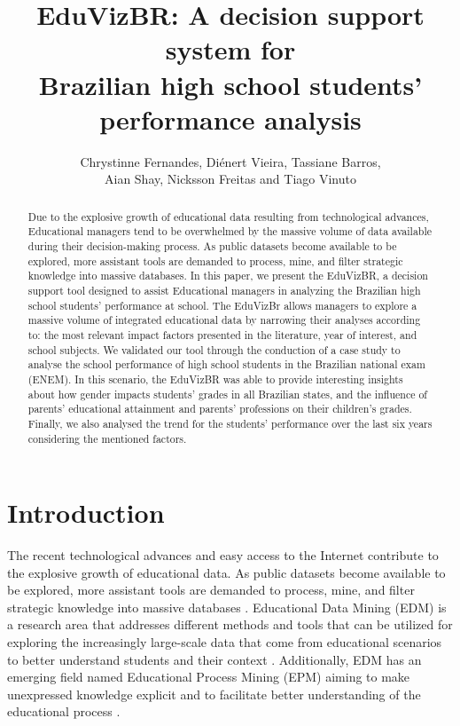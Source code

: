 \documentclass[12pt]{article}
\title{EduVizBR: A decision support system for \\ Brazilian high school students' performance analysis}
\author{Chrystinne Fernandes\inst{1}, Diénert Vieira\inst{1}, Tassiane Barros\inst{1}, \\ Aian Shay\inst{1}, 
Nicksson Freitas\inst{2} and Tiago Vinuto\inst{2}}
\begin{document}
 
\maketitle


\begin{abstract} 
Due to the explosive growth of educational data resulting from technological advances, Educational managers tend to be overwhelmed by the massive volume of data available during their decision-making process. As public datasets become available to be explored, more assistant tools are demanded to process, mine, and filter strategic knowledge into massive databases. %
In this paper, we present the EduVizBR, a decision support tool designed to assist Educational managers in analyzing the Brazilian high school students' performance  at school. %
 The EduVizBr allows managers to explore a massive volume of integrated educational data by narrowing their analyses according to: the most relevant impact factors presented in the literature, year of interest, and school subjects. We validated our tool through the conduction of a case study to analyse the school performance of high school students in the Brazilian national exam (ENEM). In this scenario, the EduVizBR was able to provide interesting insights about how gender impacts students' grades in all Brazilian states, and the influence of parents' educational attainment and parents' professions on their children's grades. Finally, we also analysed the trend for the students' performance over the last six years considering the mentioned factors.  
\end{abstract}


\section{Introduction} 

The recent technological advances and easy access to the Internet contribute to the explosive growth of educational data. As public datasets become available to be explored, more assistant tools are demanded to process, mine, and filter strategic knowledge into massive databases  \cite{Terrin2014}. Educational Data Mining (EDM) is a research area that addresses different methods and tools that can be utilized for exploring the increasingly large-scale data that come from educational scenarios to better understand students and their context \cite{Romero2020}. Additionally, EDM has an emerging field named Educational Process Mining (EPM) aiming to make unexpressed knowledge explicit and to facilitate better understanding of the educational process \cite{Bogarn2017}.
\end{document}
